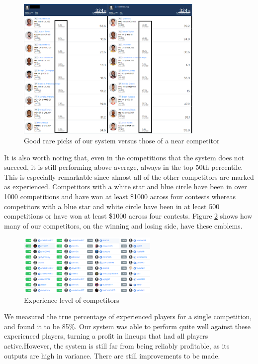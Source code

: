 \begin{figure}[ht]
    \centering
    \includegraphics[width=0.8\textwidth]{figures/mevsbest}
    \caption{Good rare picks of our system versus those of a near competitor}
    \label{fig:win_record}
\end{figure}

It is also worth noting that, even in the competitions that the system does not succeed, it is still performing above average, always in the top 50th percentile. This is especially remarkable since almost all of the other competitors are marked as experienced. Competitors with a white star and blue circle have been in over 1000 competitions and have won at least \$1000 across four contests whereas competitors with a blue star and white circle have been in at least 500 competitions or have won at least \$1000 across four contests. Figure \ref{fig:competitors} shows how many of our competitors, on the winning and losing side, have these emblems. 
\begin{figure}[ht]
    \centering
    \includegraphics[width=0.6\textwidth]{figures/competitors}
    \caption{Experience level of competitors}
    \label{fig:competitors}
\end{figure}

We measured the true percentage of experienced players for a single competition, and found it to be 85\%. Our system was able to perform quite well against these experienced players, turning a profit in lineups that had all players active.However, the system is still far from being reliably profitable, as its outputs are high in variance. There are still improvements to be made.

